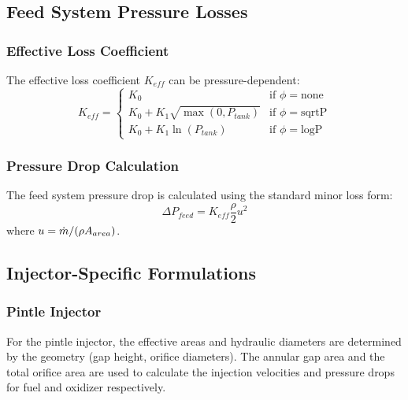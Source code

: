 \subsection{Feed System Pressure Losses}

\subsubsection{Effective Loss Coefficient}
The effective loss coefficient \(K_{eff}\) can be pressure-dependent:
\begin{equation}
K_{eff} = 
\begin{cases} 
K_0 & \text{if } \phi = \text{none} \\
K_0 + K_1 \sqrt{\max(0, P_{tank})} & \text{if } \phi = \text{sqrtP} \\
K_0 + K_1 \ln(P_{tank}) & \text{if } \phi = \text{logP}
\end{cases}
\end{equation}

\subsubsection{Pressure Drop Calculation}
The feed system pressure drop is calculated using the standard minor loss form:
\begin{equation}
\Delta P_{feed} = K_{eff} \frac{\rho}{2} u^2
\end{equation}
where \(u = \dot{m} / (\rho A_{area})\).

\subsection{Injector-Specific Formulations}

\subsubsection{Pintle Injector}
For the pintle injector, the effective areas and hydraulic diameters are determined by the geometry (gap height, orifice diameters). The annular gap area and the total orifice area are used to calculate the injection velocities and pressure drops for fuel and oxidizer respectively.
